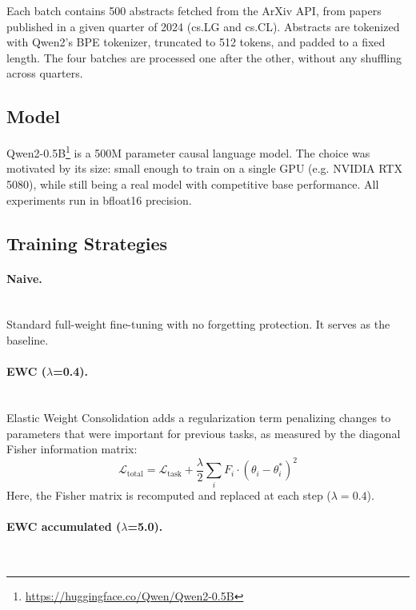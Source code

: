 \documentclass[11pt,a4paper]{article}
\begin{document}
Each batch contains 500 abstracts fetched from the ArXiv API, from papers published in a given quarter of 2024 (cs.LG and cs.CL). Abstracts are tokenized with Qwen2's BPE tokenizer, truncated to 512 tokens, and padded to a fixed length. The four batches are processed one after the other, without any shuffling across quarters.

\subsection{Model}

Qwen2-0.5B\footnote{\url{https://huggingface.co/Qwen/Qwen2-0.5B}} is a 500M parameter causal language model. 
The choice was motivated by its size: small enough to train on a single GPU (e.g. NVIDIA RTX 5080), while still being a real model with competitive base performance. 
All experiments run in bfloat16 precision.

\subsection{Training Strategies}

\paragraph{Naive.} \mbox{}\\

Standard full-weight fine-tuning with no forgetting protection. 
It serves as the baseline.

\paragraph{EWC ($\lambda$=0.4).} \mbox{}\\

Elastic Weight Consolidation \cite{kirkpatrick2017overcoming} adds a regularization term penalizing changes to parameters that were important for previous tasks, as measured by the diagonal Fisher information matrix:
\[
\mathcal{L}_{\text{total}} = \mathcal{L}_{\text{task}} + \frac{\lambda}{2} \sum_i F_i \cdot (\theta_i - \theta_i^*)^2
\]
Here, the Fisher matrix is recomputed and replaced at each step ($\lambda = 0.4$).

\paragraph{EWC accumulated ($\lambda$=5.0).} \mbox{}\\
\end{document}
